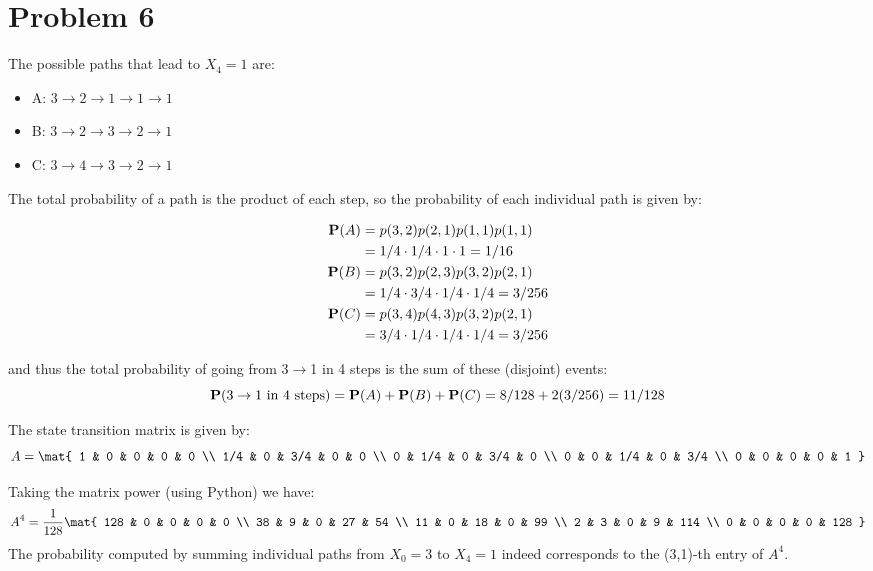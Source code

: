 \documentclass{homework}
\begin{document}
\section{Problem 6}
\begin{letterenum}
\item The possible paths that lead to $X_4=1$ are:
\begin{itemize}
    \item A: $3\to2\to1\to1\to1$
    \item B: $3\to2\to3\to2\to1$
    \item C: $3\to4\to3\to2\to1$
\end{itemize}

The total probability of a path is the product of each step, so
the probability of each individual path is given by:

\begin{align*}
    {\bf P}(A) &= p(3,2)p(2,1)p(1,1)p(1,1) \\
        &= 1/4 \cdot 1/4 \cdot 1 \cdot 1 = 1/16 \\
    {\bf P}(B) &= p(3,2)p(2,3)p(3,2)p(2,1) \\
        &= 1/4 \cdot 3/4 \cdot 1/4 \cdot 1/4 = 3/256 \\
    {\bf P}(C) &= p(3,4)p(4,3)p(3,2)p(2,1) \\
        &= 3/4 \cdot 1/4 \cdot 1/4 \cdot 1/4 = 3/256
\end{align*}

and thus the total probability of going from 3$\to$1 in 4 steps is the sum
of these (disjoint) events:
\begin{equation*}
    {\bf P}(3 \to 1 \text{ in 4 steps}) = {\bf P}(A) + {\bf P}(B) + {\bf P}(C)
        = 8/128 + 2(3/256) = 11/128
\end{equation*}

\item The state transition matrix is given by:
\begin{equation*}
    A = \mat{
        1 & 0 & 0 & 0 & 0 \\
        1/4 & 0 & 3/4 & 0 & 0 \\
        0 & 1/4 & 0 & 3/4 & 0 \\
        0 & 0 & 1/4 & 0 & 3/4 \\
        0 & 0 & 0 & 0 & 1
    }
\end{equation*}

\item Taking the matrix power (using Python) we have:
\begin{equation*}
    A^4 = \frac{1}{128} \mat{
        128 & 0 & 0 & 0 & 0 \\
        38 & 9 & 0 & 27 & 54 \\
        11 & 0 & 18 & 0 & 99 \\
        2 & 3 & 0 & 9 & 114 \\
        0 & 0 & 0 & 0 & 128
    }
\end{equation*}
The probability computed by summing individual paths from $X_0=3$ to $X_4=1$ indeed
corresponds to the (3,1)-th entry of $A^4$.


\end{letterenum}
\end{document}

